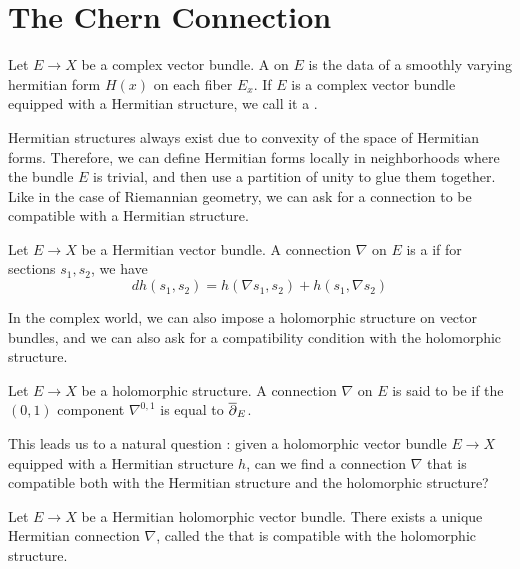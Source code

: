 \section{The Chern Connection}
%
\begin{defn}
Let $E \to X$ be a complex vector bundle. A  on $E$
is the data of a smoothly varying hermitian form $H(x)$ on each fiber $E_x$.
If $E$ is a complex vector bundle equipped with a Hermitian structure, we call it
a .
\end{defn}
%
Hermitian structures always exist due to convexity of the space of Hermitian forms.
Therefore, we can define Hermitian forms locally in neighborhoods where the bundle
$E$ is trivial, and then use a partition of unity to glue them together.
%
Like in the case of Riemannian geometry, we can ask for a connection to be compatible
with a Hermitian structure.
%
\begin{defn}
Let $E \to X$ be a Hermitian vector bundle. A connection $\nabla$ on $E$ is a
 if for sections $s_1, s_2$, we have
\[
dh(s_1,s_2) = h(\nabla s_1, s_2) + h(s_1,\nabla s_2)
\]
\end{defn}
%
In the complex world, we can also impose a holomorphic structure on vector bundles,
and we can also ask for a compatibility condition with the holomorphic structure.
%
\begin{defn}
Let $E \to X$ be a holomorphic structure. A connection $\nabla$ on $E$ is said
to be  if the $(0,1)$ component
$\nabla^{0,1}$ is equal to $\overline{\partial}_E$.
\end{defn}
%
This leads us to a natural question : given a holomorphic vector bundle $E \to X$
equipped with a Hermitian structure $h$, can we find a connection $\nabla$ that
is compatible both with the Hermitian structure and the holomorphic structure?
%
\begin{thm}
Let $E \to X$ be a Hermitian holomorphic vector bundle. There exists a unique
Hermitian connection $\nabla$, called the  that is compatible
with the holomorphic structure.
\end{thm}
%
